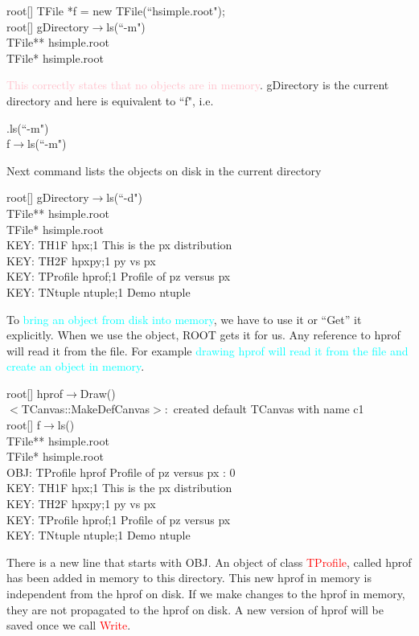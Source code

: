 \documentclass[12pt,a4paper]{article}
\begin{document}
root[] TFile *f = new TFile(``hsimple.root"); \\
root[] gDirectory$\rightarrow$ls(``-m") \\
TFile** hsimple.root \\
TFile* hsimple.root

\textcolor{pink}{This correctly states that no objects are in memory}. gDirectory is the current directory and here is equivalent to ``f", i.e.

.ls(``-m") \\
f$\rightarrow$ls(``-m")

Next command lists the objects on disk in the current directory

root[] gDirectory$\rightarrow$ls(``-d") \\
TFile** hsimple.root \\
TFile* hsimple.root \\
KEY: TH1F hpx;1 This is the px distribution \\
KEY: TH2F hpxpy;1 py vs px \\
KEY: TProfile hprof;1 Profile of pz versus px \\
KEY: TNtuple ntuple;1 Demo ntuple

To \textcolor{cyan}{bring an object from disk into memory}, we have to use it or ``Get” it explicitly. When we use the object, ROOT gets it for us. Any reference to hprof will read it from the file. For example \textcolor{cyan}{drawing hprof will read it from the file and create an object in memory}. 

root[] hprof$\rightarrow$Draw() \\
$<$TCanvas::MakeDefCanvas$>:$ created default TCanvas with name c1 \\
root[] f$\rightarrow$ls() \\
TFile** hsimple.root \\
TFile* hsimple.root \\
OBJ: TProfile hprof Profile of pz versus px : 0 \\
KEY: TH1F hpx;1 This is the px distribution \\
KEY: TH2F hpxpy;1 py vs px \\
KEY: TProfile hprof;1 Profile of pz versus px \\
KEY: TNtuple ntuple;1 Demo ntuple

There is a new line that starts with OBJ. An object of class \textcolor{red}{TProfile}, called hprof has been added in memory to this directory. This new hprof in memory is independent from the hprof on disk. If we make changes to the hprof in memory, they are not propagated to the hprof on disk. A new version of hprof will be saved once we call \textcolor{red}{Write}.
\end{document}
